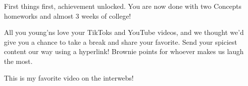
First things first, achievement unlocked. You are now done with two Concepts homeworks and almost 3 weeks of college!

All you young'ns love your TikToks and YouTube videos, and we thought we'd give you a chance to take a break and share your favorite. Send your spiciest content our way using a hyperlink! Brownie points for whoever makes us laugh the most.

This %
is my favorite video on the interwebs!
